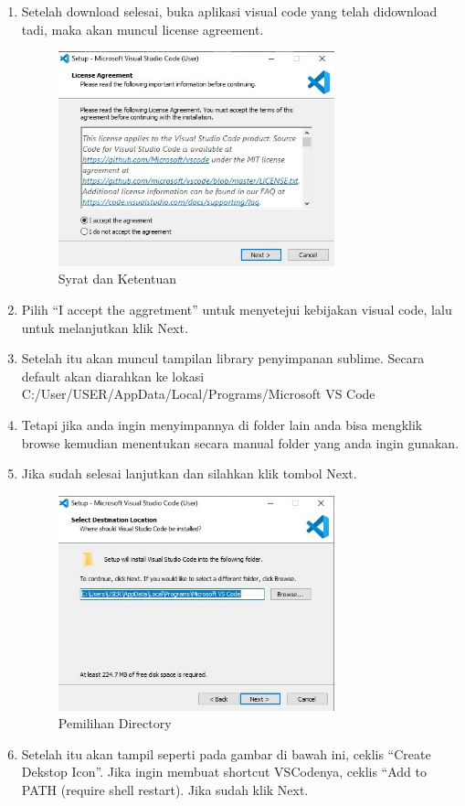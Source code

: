 \begin{enumerate}
\item Setelah download selesai, buka aplikasi visual code yang telah didownload tadi, maka akan muncul license agreement.
	\begin{figure}[H]
		\includegraphics[width=8cm]{figures/instalasi/vsc2.jpg}
		\centering
		\caption{Syrat dan Ketentuan}
	\end{figure}
\item Pilih “I accept the aggretment” untuk menyetejui kebijakan visual code, lalu untuk melanjutkan klik Next.
\item Setelah itu akan muncul tampilan library penyimpanan sublime. Secara default akan diarahkan ke lokasi C:/User/USER/AppData/Local/Programs/Microsoft VS Code 
\item Tetapi jika anda ingin menyimpannya di folder lain anda bisa mengklik browse kemudian menentukan secara manual folder yang anda ingin gunakan.
\item Jika sudah selesai lanjutkan dan silahkan klik tombol Next.
	\begin{figure}[H]
		\includegraphics[width=8cm]{figures/instalasi/vsc3.jpg}
		\centering
		\caption{Pemilihan Directory}
	\end{figure}
\item Setelah itu akan tampil seperti pada gambar di bawah ini, ceklis “Create Dekstop Icon”. Jika ingin membuat shortcut VSCodenya, ceklis “Add to PATH (require shell restart). Jika sudah klik Next.


\end{enumerate}
